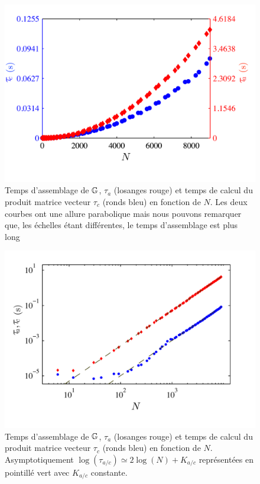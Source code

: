 \documentclass[10pt]{article}
\begin{document}
\begin{multicols}{2}
\begin{figure}[H]
  \begin{center}
  \includegraphics[width=0.95\columnwidth]{Q2a_5.pdf}
  \vspace*{-20pt}
  \caption{Temps d'assemblage de $\mathbb{G}$, $\tau_a$ (losanges rouge) et temps de calcul du produit matrice vecteur $\tau_c$ (ronds bleu) en fonction de $N$. Les deux courbes ont une allure parabolique mais nous pouvons remarquer que, les échelles étant différentes, le temps d'assemblage est plus long}
  \label{fig:Q2a}
  \end{center}
\end{figure}
\vspace*{-40pt}

\begin{figure}[H]
  \begin{center}
  \includegraphics[width=0.95\columnwidth]{Q2b_5.pdf}
  \vspace*{-20pt}
  \caption{Temps d'assemblage de $\mathbb{G}$, $\tau_a$ (losanges rouge) et temps de calcul du produit matrice vecteur $\tau_c$  (ronds bleu) en fonction de $N$. Asymptotiquement $\log(\tau_{a/c}) \simeq 2\log(N)+K_{a/c}$ représentées en pointillé vert avec $K_{a/c}$ constante.}
  \label{fig:Q2b} 
  \end{center}
\end{figure}
\vspace*{-20pt}


\end{multicols}
\end{document}
